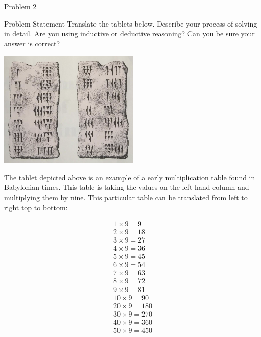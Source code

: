\begin{problem}{Problem 2}
    \begin{statement}{Problem Statement}
        Translate the tablets below. Describe your process of solving in detail. Are you using inductive or deductive reasoning? Can you be sure your answer is correct?

        \begin{center}
            \includegraphics[width = 0.5\textwidth]{"./Images/Babylonian Tablet.png"}
        \end{center}
    \end{statement}

    \begin{Highlight}[Solution]
        The tablet depicted above is an example of a early multiplication table found in Babylonian times. This table is taking the values on the left hand column and multiplying them by nine. This 
        particular table can be translated from left to right top to bottom:

        \begin{eqnarray*}
            1 \times 9 = 9 \\
            2 \times 9 = 18 \\
            3 \times 9 = 27 \\
            4 \times 9 = 36 \\
            5 \times 9 = 45 \\
            6 \times 9 = 54 \\
            7 \times 9 = 63 \\
            8 \times 9 = 72 \\
            9 \times 9 = 81 \\
            10 \times 9 = 90 \\
            20 \times 9 = 180 \\
            30 \times 9 = 270 \\
            40 \times 9 = 360 \\
            50 \times 9 = 450 \\
        \end{eqnarray*}


\end{Highlight}
\end{problem}
